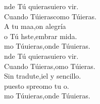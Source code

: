 \begin{cancion}%
	nde Tú quierasuiero vir.\\
	Cuando Túierascomo Túieras. \\
	A tu maa,on alegría\\
	o Tú hste,embrar mida.\\
	mo Túuieras,onde Túuieras. \\
	nde Tú quierasuiero vir.\\
	Cuando Túieras,omo Túieras. \\
	Sin tradute,iel y sencillo.\\
	puesto spreomo tu o.\\
	mo Túuieras,onde Túuieras.\\
\end{cancion}%
